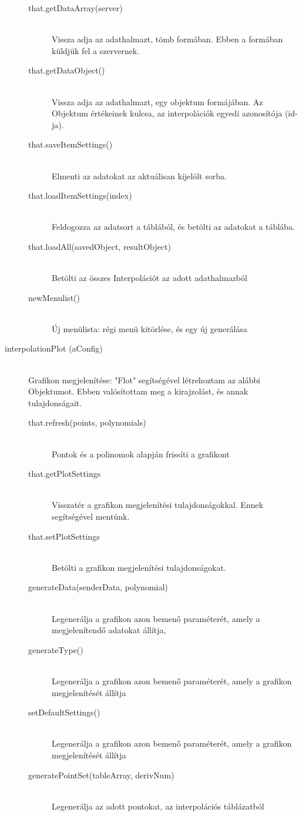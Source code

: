 \begin{description}
\begin{description}
			\item[that.getDataArray(server)] 
			\hfill \\ Vissza adja az adathalmazt, tömb formában. Ebben a formában küldjük fel a szervernek.
			\item[that.getDataObject()] 
			\hfill \\ Vissza adja az adathalmazt, egy objektum formájában. Az Objektum értékeinek kulcsa, az interpolációk egyedi azonosítója (id-ja).
			\item[that.saveItemSettings()] 
			\hfill \\ Elmenti az adatokat az aktuálisan kijelölt sorba.
			\item[that.loadItemSettings(index)]
			\hfill \\ Feldogozza az adatsort a táblából, és betölti az adatokat a táblába.
			\item[that.loadAll(savedObject, resultObject)] 
			\hfill \\Betölti az összes Interpolációt az adott adathalmazból
			\item[newMenulist()] 
			\hfill \\
			Új menülista: régi menü kitörlése, és egy új generálása
			\hfill \\ 
			\end{description}
		\item[interpolationPlot (aConfig)]
			\hfill \\ Grafikon megjelenítése: "Flot" segítségével létrehoztam az alábbi Objektumot. Ebben valósítottam meg a kirajzolást, és annak tulajdonságait.
			\begin{description}
			\item[that.refresh(points, polynomials)]
			\hfill \\ Pontok és a polinomok alapján frissíti a grafikont
			\item[that.getPlotSettings]
			\hfill \\ Visszatér a grafikon megjelenítési tulajdonságokkal. Ennek segítségével mentünk.
			\item[that.setPlotSettings]
			\hfill \\ Betölti a grafikon megjelenítési tulajdonságokat.
			\item[generateData(senderData, polynomial)]
			\hfill \\ Legenerálja a grafikon azon bemenő paraméterét, amely a megjelenítendő adatokat állítja,

			\item[generateType()]
			\hfill \\ Legenerálja a grafikon azon bemenő paraméterét, amely a grafikon megjelenítését állítja
			\item[setDefaultSettings()]
			\hfill \\ Legenerálja a grafikon azon bemenő paraméterét, amely a grafikon megjelenítését állítja
			\item[generatePointSet(tableArray, derivNum)]
			\hfill \\ Legenerálja az adott pontokat, az interpolációs táblázatból
			\end{description}


\end{description}
